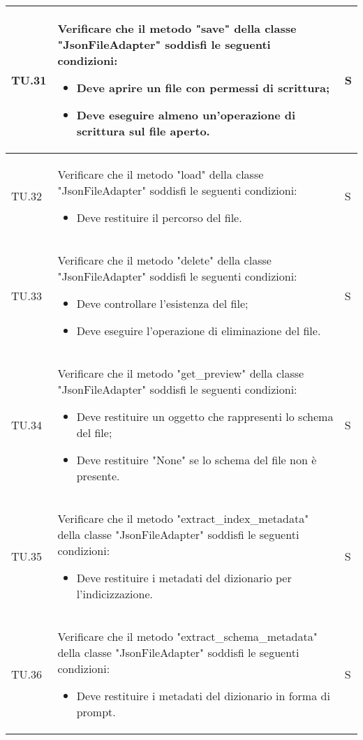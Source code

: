 \begin{adjustwidth}{-0.5cm}{-0.5cm}
\begin{longtable}{|P{1.5cm}|>{\raggedright}P{9.5cm}|>{\arraybackslash}P{1.5cm}|}
		\hline TU.31 & Verificare che il metodo "save" della classe "JsonFileAdapter" soddisfi le seguenti condizioni:
		\begin{itemize}
			\item Deve aprire un file con permessi di scrittura;
			\item Deve eseguire almeno un'operazione di scrittura sul file aperto.
		\end{itemize} & S \\

		\hline TU.32 & Verificare che il metodo "load" della classe "JsonFileAdapter" soddisfi le seguenti condizioni:
		\begin{itemize}
			\item Deve restituire il percorso del file.
		\end{itemize} & S \\

		\hline TU.33 & Verificare che il metodo "delete" della classe "JsonFileAdapter" soddisfi le seguenti condizioni:
		\begin{itemize}
			\item Deve controllare l'esistenza del file;
			\item Deve eseguire l'operazione di eliminazione del file.
		\end{itemize} & S \\

		\hline TU.34 & Verificare che il metodo "get\_preview" della classe "JsonFileAdapter" soddisfi le seguenti condizioni:
		\begin{itemize}
			\item Deve restituire un oggetto che rappresenti lo schema del file;
			\item Deve restituire "None" se lo schema del file non è presente.
		\end{itemize} & S \\

		\hline TU.35 & Verificare che il metodo "extract\_index\_metadata" della classe "JsonFileAdapter" soddisfi le seguenti condizioni:
		\begin{itemize}
			\item Deve restituire i metadati del dizionario per l'indicizzazione.
		\end{itemize} & S \\

		\hline TU.36 & Verificare che il metodo "extract\_schema\_metadata" della classe "JsonFileAdapter" soddisfi le seguenti condizioni:
		\begin{itemize}
			\item Deve restituire i metadati del dizionario in forma di prompt.
		\end{itemize} & S \\


\end{longtable}
\end{adjustwidth}

